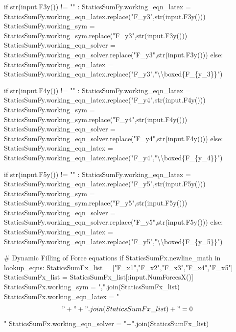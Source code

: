 \documentclass[
  letterpaper,
  DIV=11,
  numbers=noendperiod]{scrreprt}
\newenvironment{Shaded}{\begin{snugshade}}{\end{snugshade}}
\newcommand{\NormalTok}[1]{\textcolor[rgb]{0.00,0.23,0.31}{#1}}
\begin{document}
\begin{Shaded}
\begin{Highlighting}[]
\NormalTok{            if str(input.F3y()) != "" : }
\NormalTok{                StaticsSumFy.working\_eqn\_latex = StaticsSumFy.working\_eqn\_latex.replace("F\_y3",str(input.F3y()))}
\NormalTok{                StaticsSumFy.working\_sym = StaticsSumFy.working\_sym.replace("F\_y3",str(input.F3y()))}
\NormalTok{                StaticsSumFy.working\_eqn\_solver = StaticsSumFy.working\_eqn\_solver.replace("F\_y3",str(input.F3y()))}
\NormalTok{            else:}
\NormalTok{                StaticsSumFy.working\_eqn\_latex = StaticsSumFy.working\_eqn\_latex.replace("F\_y3","\textbackslash{}\textbackslash{}boxed\{F\_\{y\_3\}\}")}
        
\NormalTok{            if str(input.F4y()) != "" : }
\NormalTok{                StaticsSumFy.working\_eqn\_latex = StaticsSumFy.working\_eqn\_latex.replace("F\_y4",str(input.F4y()))}
\NormalTok{                StaticsSumFy.working\_sym = StaticsSumFy.working\_sym.replace("F\_y4",str(input.F4y()))}
\NormalTok{                StaticsSumFy.working\_eqn\_solver = StaticsSumFy.working\_eqn\_solver.replace("F\_y4",str(input.F4y()))}
\NormalTok{            else:}
\NormalTok{                StaticsSumFy.working\_eqn\_latex = StaticsSumFy.working\_eqn\_latex.replace("F\_y4","\textbackslash{}\textbackslash{}boxed\{F\_\{y\_4\}\}")}
        
\NormalTok{            if str(input.F5y()) != "" : }
\NormalTok{                StaticsSumFy.working\_eqn\_latex = StaticsSumFy.working\_eqn\_latex.replace("F\_y5",str(input.F5y()))}
\NormalTok{                StaticsSumFy.working\_sym = StaticsSumFy.working\_sym.replace("F\_y5",str(input.F5y()))}
\NormalTok{                StaticsSumFy.working\_eqn\_solver = StaticsSumFy.working\_eqn\_solver.replace("F\_y5",str(input.F5y()))}
\NormalTok{            else:}
\NormalTok{                StaticsSumFy.working\_eqn\_latex = StaticsSumFy.working\_eqn\_latex.replace("F\_y5","\textbackslash{}\textbackslash{}boxed\{F\_\{y\_5\}\}")}
      
\NormalTok{  \# Dynamic Filling of Force equations }
\NormalTok{        if StaticsSumFx.newline\_math in lookup\_eqns:}
\NormalTok{            StaticsSumFx\_list = ["F\_x1","F\_x2","F\_x3","F\_x4","F\_x5"]}
\NormalTok{            StaticsSumFx\_list = StaticsSumFx\_list[:input.NumForcesX()]}
\NormalTok{            StaticsSumFx.working\_sym = ",".join(StaticsSumFx\_list)}
\NormalTok{            StaticsSumFx.working\_eqn\_latex = "$$" + "+".join(StaticsSumFx\_list) + "=0$$"}
\NormalTok{            StaticsSumFx.working\_eqn\_solver = "+".join(StaticsSumFx\_list)}
            

\end{Highlighting}
\end{Shaded}
\end{document}
